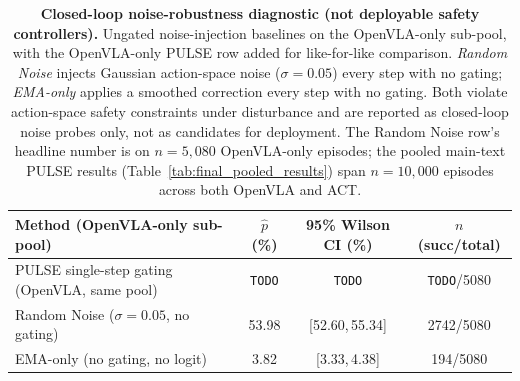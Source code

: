 \begin{table}[h]
\centering
\small
\caption{\textbf{Closed-loop noise-robustness diagnostic (not deployable safety controllers).} Ungated noise-injection baselines on the OpenVLA-only sub-pool, with the OpenVLA-only PULSE row added for like-for-like comparison. \emph{Random Noise} injects Gaussian action-space noise ($\sigma{=}0.05$) every step with no gating; \emph{EMA-only} applies a smoothed correction every step with no gating. Both violate action-space safety constraints under disturbance and are reported as closed-loop noise probes only, not as candidates for deployment. The Random Noise row's headline number is on $n{=}5{,}080$ OpenVLA-only episodes; the pooled main-text PULSE results (Table~\ref{tab:final_pooled_results}) span $n{=}10{,}000$ episodes across both OpenVLA and ACT.}
\label{tab:noise_robustness_diagnostic}
\setlength{\tabcolsep}{6pt}
\begin{tabular}{lccc}
\toprule
Method (OpenVLA-only sub-pool) & $\hat p$ (\%) & 95\% Wilson CI (\%) & $n$ (succ/total) \\
\midrule
PULSE single-step gating (OpenVLA, same pool) & \texttt{TODO} & \texttt{TODO} & \texttt{TODO}/5080 \\
Random Noise ($\sigma{=}0.05$, no gating) & 53.98 & [52.60,\,55.34] & 2742/5080 \\
EMA-only (no gating, no logit) & 3.82 & [3.33,\,4.38] & 194/5080 \\
\bottomrule
\end{tabular}
\end{table}
